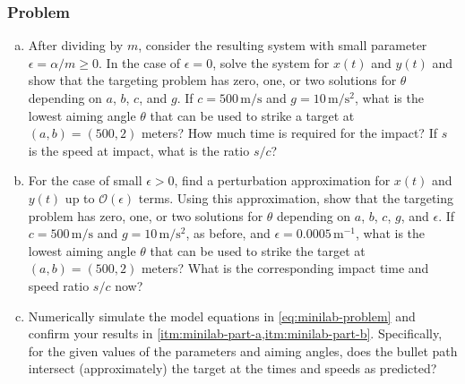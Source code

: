 \documentclass[12pt]{article}
\begin{document}
\subsubsection*{Problem}
\begin{enumerate}[(a)]
\item\label{itm:minilab-part-a} After dividing by $m$, consider the resulting
  system with small parameter $\epsilon=\alpha/m\ge0$. In the case of
  $\epsilon=0$, solve the system for $x(t)$ and $y(t)$ and show that the
  targeting problem has zero, one, or two solutions for $\theta$ depending on
  $a$, $b$, $c$, and $g$. If $c=500\,\text{m/s}$ and $g=10\,\text{m/s$^2$}$,
  what is the lowest aiming angle $\theta$ that can be used to strike a target
  at $(a,b)=(500,2)$ meters? How much time is required for the impact? If $s$ is
  the speed at impact, what is the ratio $s/c$?
\item\label{itm:minilab-part-b} For the case of small $\epsilon>0$, find a
  perturbation approximation for $x(t)$ and $y(t)$ up to $\mathcal{O}(\epsilon)$
  terms. Using this approximation, show that the targeting problem has zero,
  one, or two solutions for $\theta$ depending on $a$, $b$, $c$, $g$, and
  $\epsilon$. If $c=500\,\text{m/s}$ and $g=10\,\text{m/s$^2$}$, as before, and
  $\epsilon=0.0005\,\text{m$^{-1}$}$, what is the lowest aiming angle $\theta$
  that can be used to strike the target at $(a,b)=(500,2)$ meters? What is the
  corresponding impact time and speed ratio $s/c$ now?
\item Numerically simulate the model equations in \cref{eq:minilab-problem} and
  confirm your results in \cref{itm:minilab-part-a,itm:minilab-part-b}.
  Specifically, for the given values of the parameters and aiming angles, does
  the bullet path intersect (approximately) the target at the times and speeds
  as predicted?
\end{enumerate}
\newpage
\end{document}
